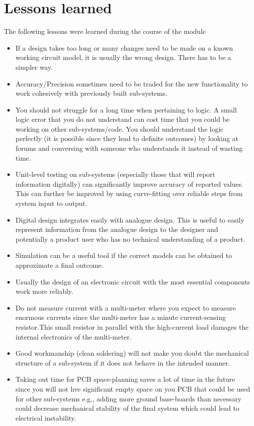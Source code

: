 \section{Lessons learned}
The following lessons were learned during the course of the module
\begin{itemize}
    \item If a design takes too long or many changes need to be made on a known working circuit model, it is usually the wrong design. There has to be a simpler way.
    \item Accuracy/Precision sometimes need to be traded for the new functionality to work cohesively with previously built sub-systems.
    \item You should not struggle for a long time when pertaining to logic. A small logic error that you do not understand can cost time that you could be working on other sub-systems/code. You should understand the logic perfectly (it is possible since they lead to definite outcomes) by looking at forums and conversing with someone who understands it instead of wasting time.
    \item Unit-level testing on sub-systems (especially those that will report information digitally) can significantly improve accuracy of reported values. This can further be improved by using curve-fitting over reliable steps from  system input to output.
    \item Digital design integrates easily with analogue design. This is useful to easily represent information from the analogue design to the designer and potentially a product user who has no technical understanding of a product.
    \item Simulation can be a useful tool if the correct models can be obtained to approximate a final outcome.
    \item Usually the design of an electronic circuit with the most essential components work more reliably.
    \item Do not measure current with a multi-meter where you expect to measure enormous currents since the multi-meter  has a minute current-sensing resistor.This small resistor in parallel with the high-current load damages the internal electronics of the multi-meter.
    \item Good workmanship (clean soldering) will not make you doubt the mechanical structure of a sub-system if it does not behave in the intended manner.
    \item Taking out time for PCB space-planning saves a lot of time in the future since you will not hve significant empty space on you PCB that could be used for other sub-systems e.g., adding more ground base-boards than necessary could decrease mechanical stability of the final system which could lead to electrical instability.
\end{itemize}























